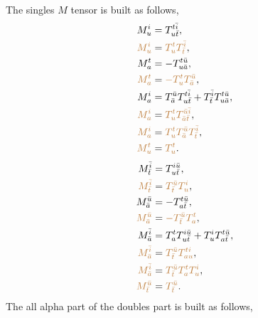 \documentclass[a4paper,12pt,oneside]{book}
\newcommand{\brown}[1]{{\color{brown} #1}}
\newcommand{\spa}[1]{{#1}}
\newcommand{\spb}[1]{\bar{#1}}
\begin{document}
The singles $M$ tensor is built as follows,
\begin{align}
M^{\spa{i}}_{\spa{u}} &= T^{\spa{t}\spb{i}}_{\spa{u}\spb{t}}, \\
\brown{M^{\spa{i}}_{\spa{u}}} &= \brown{T^{\spa{t}}_{\spa{u}} T^{\spb{i}}_{\spb{t}}}, \\
M^{\spa{t}}_{\spa{a}} &= -T^{\spa{t}\spb{u}}_{\spa{u}\spb{a}}, \\
\brown{M^{\spa{t}}_{\spa{a}}} &= \brown{-T^{\spa{t}}_{\spa{u}} T^{\spb{u}}_{\spb{a}}}, \\
M^{\spa{i}}_{\spa{a}} &= T^{\spb{u}}_{\spb{a}} T^{t\spb{i}}_{u\spb{t}} + T^{\spb{i}}_{\spb{t}} T^{t\spb{u}}_{u\spb{a}}, \\
\brown{M^{\spa{i}}_{\spa{a}}} &= \brown{T^{\spa{t}}_{\spa{u}} T^{\spb{u}\spb{i}}_{\spb{a}\spb{t}}}, \\
\brown{M^{\spa{i}}_{\spa{a}}} &= \brown{T^{\spa{t}}_{\spa{u}} T^{\spb{u}}_{\spb{a}} T^{\spb{i}}_{\spb{t}}}, \\
\brown{M^{\spa{t}}_{\spa{u}}} &= \brown{T^{\spa{t}}_{\spa{u}}}.
\end{align}
\begin{align}
M^{\spb{i}}_{\spb{t}} &= T^{\spa{i}\spb{u}}_{\spa{u}\spb{t}}, \\
\brown{M^{\spb{i}}_{\spb{t}}} &= \brown{T^{\spb{u}}_{\spb{t}} T^{\spa{i}}_{\spa{u}}}, \\
M^{\spb{u}}_{\spb{a}} &= - T^{\spa{t}\spb{u}}_{\spa{a}\spb{t}}, \\
\brown{M^{\spb{u}}_{\spb{a}}} &= \brown{- T^{\spb{u}}_{\spb{t}} T^{\spa{t}}_{\spa{a}}}, \\
M^{\spb{i}}_{\bar{a}} &= T^{\spa{t}}_{\spa{a}} T^{\spa{i}\spb{u}}_{u\spb{t}} + T^{\spa{i}}_{\spa{u}} T^{\spa{t}\spb{u}}_{\spa{a}\spb{t}}, \\
\brown{M^{\spb{i}}_{\spb{a}}} &= \brown{T^{\spb{u}}_{\spb{t}} T^{\spa{t}\spa{i}}_{\spa{a}\spa{u}}}, \\
\brown{M^{\spb{i}}_{\spb{a}}} &= \brown{T^{\spb{u}}_{\spb{t}} T^{\spa{t}}_{\spa{a}} T^{\spa{i}}_{\spa{u}}}, \\
\brown{M^{\spb{u}}_{\spb{t}}} &= \brown{T^{\spb{u}}_{\spb{t}}}.
\end{align}
The all alpha part of the doubles part is built as follows,
\end{document}
